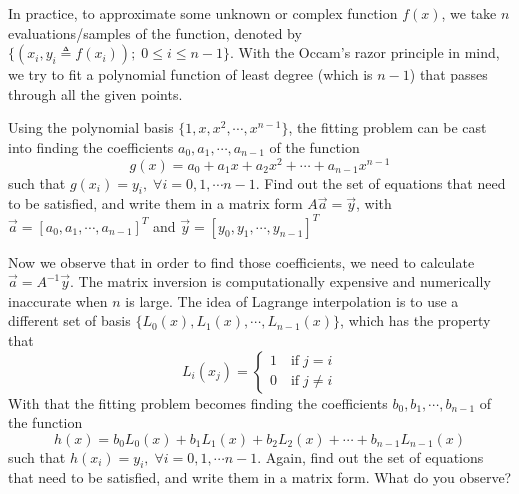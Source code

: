 
In practice, to approximate some unknown or complex function $f(x)$, we take $n$ evaluations/samples
of the function, denoted by $\{ (x_i, y_i\triangleq f(x_i)); \; 0 \leq i \leq n-1 \}$. With the
Occam's razor principle in mind, we try to fit a polynomial function of least degree (which is $n-1$)
that passes through all the given points.


\begin{enumerate}

	\qitem Using the polynomial basis $\{1, x, x^2, \cdots, x^{n-1}\}$, the fitting
	problem can be cast into finding the coefficients $a_0,a_1,\cdots,a_{n-1}$ of the function
	$$g(x) = a_0 + a_1x + a_2x^2 +\cdots + a_{n-1}x^{n-1}$$
	such that
	$g(x_i) = y_i, \; \forall i=0,1,\cdots n-1 $. Find out the set of equations that need to be satisfied, and write
	them in a matrix form $A\vec{a} = \vec{y}$, with $\vec{a} = [a_0,a_1,\cdots,a_{n-1}]^T$ and $\vec{y} = [y_0,y_1,\cdots,y_{n-1}]^T$



	\qitem Now we observe that in order to find those coefficients, we need to calculate $\vec{a} = A^{-1}\vec{y}$. The matrix inversion
	is computationally expensive and numerically inaccurate when $n$ is large. The idea of Lagrange interpolation is to use
	a different set of basis $\{ L_0(x),L_1(x),\cdots,L_{n-1}(x)\}$, which has the property that
	$$L_i(x_j) = \begin{cases}
	1 \quad \text{if} \; j=i \\
	0 \quad \text{if} \; j \neq i
	\end{cases}
	$$
	With that the fitting problem becomes finding the coefficients $b_0,b_1,\cdots,b_{n-1}$ of the function
	$$h(x) = b_0L_0(x) + b_1L_1(x) + b_2L_2(x) +\cdots + b_{n-1}L_{n-1}(x)$$
	such that $h(x_i) = y_i, \; \forall i=0,1,\cdots n-1 $. Again, find out the set of equations that need to be satisfied, and write
	them in a matrix form. What do you observe?


\end{enumerate}
